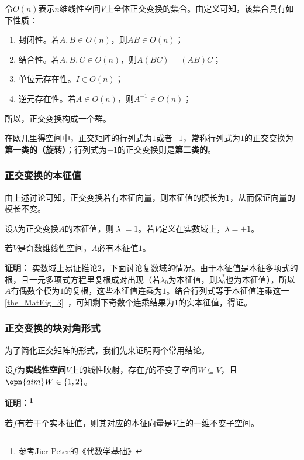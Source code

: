 令$O(n)$表示$n$维线性空间$V$上全体正交变换的集合。由定义可知，该集合具有如下性质：
\begin{enumerate}
\item 封闭性。若$A,B\in O(n)$，则$AB\in O(n)$；
\item 结合性。若$A,B,C\in O(n)$，则$A(BC)=(AB)C$；
\item 单位元存在性。$I\in O(n)$；
\item 逆元存在性。若$A\in O(n)$，则$A^{-1}\in O(n)$；
\end{enumerate}
所以，正交变换构成一个群。

在欧几里得空间中，正交矩阵的行列式为$1$或者$-1$，常称行列式为$1$的正交变换为\textbf{第一类的（旋转）}；行列式为$-1$的正交变换则是\textbf{第二类的}。
\subsubsection{正交变换的本征值}
由上述讨论可知，正交变换若有本征向量，则本征值的模长为$1$，从而保证向量的模长不变。
\begin{corollary}{}
 设$\lambda$为正交变换$A$的本征值，则$|\lambda|=1$。若$V$定义在实数域上，$\lambda=\pm 1$。
\end{corollary}
\begin{corollary}{}
若$V$是奇数维线性空间，$A$必有本征值$1$。
\end{corollary}
\textbf{证明：}
实数域上易证推论2，下面讨论复数域的情况。由于本征值是本征多项式的根，且一元多项式方程里复根成对出现（若$\lambda_0$为本征值，则$\lambda_0^{*}$也为本征值），所以$A$有偶数个模为$1$的复根，这些本征值连乘为$1$。结合行列式等于本征值连乘这一\autoref{the_MatEig_3}~，可知剩下奇数个连乘结果为1的实本征值，得证。
\subsubsection{正交变换的块对角形式}
为了简化正交矩阵的形式，我们先来证明两个常用结论。
\begin{lemma}{}\label{lem_ortho_1}
设$f$为\textbf{实线性空间}$V$上的线性映射，存在$f$的不变子空间$W\subseteq V$，且$\opn{dim}W\in\{1,2\}$。
\end{lemma}
\textbf{证明：\footnote{参考Jier Peter的《代数学基础》}}

若$f$有若干个实本征值，则其对应的本征向量是$V$上的一维不变子空间。

